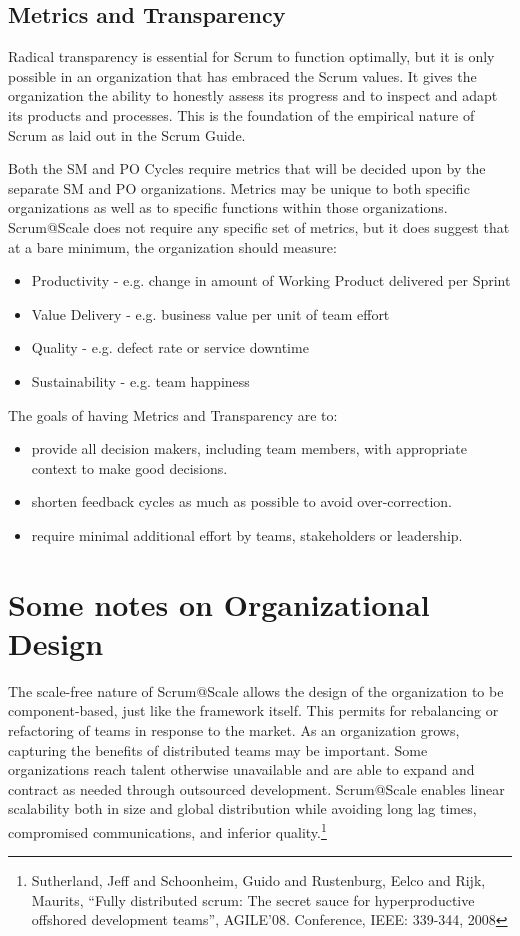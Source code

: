 \documentclass[12pt,a4paper,parskip=full]{scrartcl}
\begin{document}
\subsection{Metrics and Transparency}

Radical transparency is essential for Scrum to function optimally, but it is only possible in an organization that has embraced the Scrum values. It gives the organization the ability to honestly assess its progress and to inspect and adapt its products and processes. This is the foundation of the empirical nature of Scrum as laid out in the Scrum Guide.

Both the SM and PO Cycles require metrics that will be decided upon by the separate SM and PO organizations. Metrics may be unique to both specific organizations as well as to specific functions within those organizations. Scrum@Scale does not require any specific set of metrics, but it does suggest that at a bare minimum, the organization should measure:

\begin{itemize}
	\item Productivity - e.g. change in amount of Working Product delivered per Sprint
	\item Value Delivery - e.g. business value per unit of team effort
	\item Quality - e.g. defect rate or service downtime
	\item Sustainability - e.g. team happiness
\end{itemize}

The goals of having Metrics and Transparency are to:

\begin{itemize}
	\item provide all decision makers, including team members, with appropriate context to make good decisions.
	\item shorten feedback cycles as much as possible to avoid over-correction.
	\item require minimal additional effort by teams, stakeholders or leadership.
\end{itemize}

\section{Some notes on Organizational Design}

The scale-free nature of Scrum@Scale allows the design of the organization to be component-based, just like the framework itself. This permits for rebalancing or refactoring of teams in response to the market. As an organization grows, capturing the benefits of distributed teams may be important. Some organizations reach talent otherwise unavailable and are able to expand and contract as needed through outsourced development. Scrum@Scale enables linear scalability both in size and global distribution while avoiding long lag times, compromised communications, and inferior quality.\footnote{Sutherland, Jeff and Schoonheim, Guido and Rustenburg, Eelco and Rijk, Maurits, ``Fully distributed scrum: The secret sauce for hyperproductive offshored development teams'', AGILE'08. Conference, IEEE: 339-344, 2008}
\end{document}
